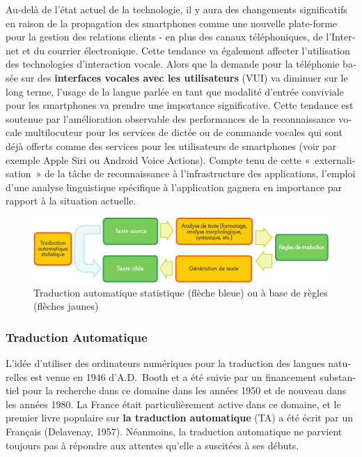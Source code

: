 \begin{french}
\begin{multicols}{2}
Au-delà de l'état actuel de la technologie, il y aura des
changements significatifs en raison de la propagation des smartphones
comme une nouvelle plate-forme pour la gestion des relations clients -
en plus des canaux téléphoniques, de l'Internet et du courrier
électronique. Cette tendance va également affecter l'utilisation des technologies d'interaction vocale. Alors
que la demande pour la téléphonie basée sur des {\bf interfaces
  vocales avec les utilisateurs} (VUI) va diminuer sur le long terme,
l'usage de la langue parlée en tant que modalité d'entrée conviviale pour les smartphones va prendre une importance
significative. Cette tendance est soutenue par l'amélioration
observable des performances de la reconnaissance vocale multilocuteur
pour les services de dictée ou de commande vocales qui sont déjà
offerts comme des services pour les utilisateurs de smartphones (voir
par exemple Apple Siri ou Android Voice Actions). Compte tenu de cette
«~externalisation~» de la tâche de reconnaissance à l'infrastructure des applications, l'emploi d'une
analyse linguistique spécifique à l'application gagnera en
importance par rapport à la situation actuelle.

\begin{figure}[t]
\begin{center}
 \includegraphics[width=\textwidth]{../_media/french/machine_translation}
\caption{Traduction automatique statistique (flèche bleue) ou à base de règles (flèches jaunes)}
\label{fig:mtarchi}
\end{center}
\end{figure}

\subsubsection{Traduction Automatique}
L'idée d'utiliser des ordinateurs numériques pour la traduction des
langues naturelles est venue en 1946 d'A.D.~Booth et a été suivie par
un financement substantiel pour la recherche dans ce domaine dans les
années 1950 et de nouveau dans les années 1980. La France était
particulièrement active dans ce domaine, et le premier livre populaire
sur {\bf la traduction automatique} (TA) a été écrit par un Français
(Delavenay, 1957). Néanmoins, la traduction automatique ne
parvient toujours pas à répondre aux attentes qu'elle a suscitées à
ses débuts.


\end{multicols}
\end{french}
